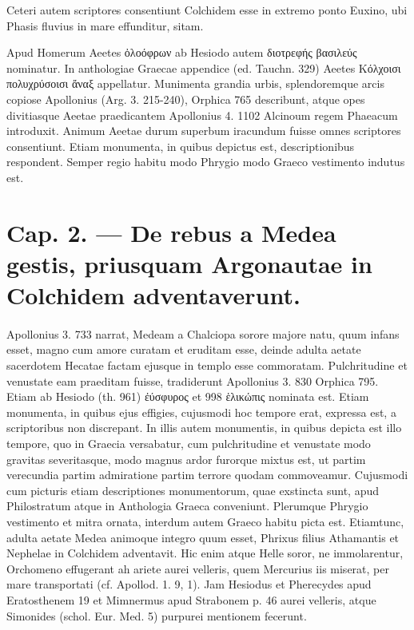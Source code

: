 \documentclass[a4paper, 11pt, oneside, polutonikogreek, german]{article}
\begin{document}
Ceteri autem scriptores consentiunt Colchidem esse in extremo ponto Euxino, ubi Phasis fluvius in mare effunditur, sitam.

Apud Homerum Aeetes ὀλοόφρων ab Hesiodo autem διοτρεφής βασιλεύς nominatur. In anthologiae Graecae appendice (ed. Tauchn. 329) Aeetes Κόλχοισι πολυχρύσοισι ἄναξ appellatur. Munimenta grandia urbis, splendoremque arcis copiose Apollonius (Arg. 3. 215-240), Orphica 765 describunt, atque opes divitiasque Aeetae praedicantem Apollonius 4. 1102 Alcinoum regem Phaeacum introduxit. Animum Aeetae durum superbum iracundum fuisse omnes scriptores consentiunt. Etiam monumenta, in quibus depictus est, descriptionibus respondent. Semper regio habitu modo Phrygio modo Graeco vestimento indutus est.
\clearpage
\section{Cap. 2. --- De rebus a Medea gestis, priusquam Argonautae in Colchidem adventaverunt.}
\paragraph{}
Apollonius 3. 733 narrat, Medeam a Chalciopa sorore majore natu, quum infans esset, magno cum amore curatam et eruditam esse, deinde adulta aetate sacerdotem Hecatae factam ejusque in templo esse commoratam. Pulchritudine et venustate eam praeditam fuisse, tradiderunt Apollonius 3. 830 Orphica 795. Etiam ab Hesiodo (th. 961) ἐύσφυρος et 998 ἑλικώπις nominata est. Etiam monumenta, in quibus ejus effigies, cujusmodi hoc tempore erat, expressa est, a scriptoribus non discrepant. In illis autem monumentis, in quibus depicta est illo tempore, quo in Graecia versabatur, cum pulchritudine et venustate modo gravitas severitasque, modo magnus ardor furorque mixtus est, ut partim verecundia partim admiratione partim terrore quodam commoveamur. Cujusmodi cum picturis etiam descriptiones monumentorum, quae exstincta sunt, apud Philostratum atque in Anthologia Graeca conveniunt. Plerumque Phrygio vestimento et mitra ornata, interdum autem Graeco habitu picta est. Etiamtunc, adulta aetate Medea animoque integro quum esset, Phrixus filius Athamantis et Nephelae in Colchidem adventavit. Hic enim atque Helle soror, ne immolarentur, Orchomeno effugerant ah ariete aurei velleris, quem Mercurius iis miserat, per mare transportati (cf. Apollod. 1. 9, 1). Jam Hesiodus et Pherecydes apud Eratosthenem 19 et Mimnermus apud Strabonem p. 46 aurei velleris, atque Simonides (schol. Eur. Med. 5) purpurei mentionem fecerunt.
\end{document}
